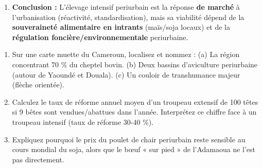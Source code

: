 \documentclass[11pt]{article}
\begin{document}
\begin{exoresolu}
\begin{enumerate}
\begin{itemize}
        \item \textbf{Pression foncière/environnementale :} Urbanisation galopante grignote terres agricoles periurbaines ; gestion effluents (fientes, lisiers) souvent défaillante $\to$ pollution nappes/eaux de surface (ex: Mfoundi, Wouri).
        \item \textbf{Sanitaire :} Concentration animale = risque épizootique majeur (Influenza aviaire, Peste porcine africaine) $\to$ biosécurité coûteuse.
    \end{itemize}
    \item \textbf{Conclusion :} L'élevage intensif periurbain est la réponse \textbf{de marché} à l'urbanisation (réactivité, standardisation), mais sa viabilité dépend de la \textbf{souveraineté alimentaire en intrants} (maïs/soja locaux) et de la \textbf{régulation foncière/environnementale} periurbaine.
\end{enumerate}
\end{exoresolu}

\begin{exercice}
\begin{enumerate}
    \item Sur une carte muette du Cameroun, localisez et nommez : (a) La région concentrant 70 \% du cheptel bovin. (b) Deux bassins d'aviculture periurbaine (autour de Yaoundé et Douala). (c) Un couloir de transhumance majeur (flèche orientée).
    \item Calculez le taux de réforme annuel moyen d'un troupeau extensif de 100 têtes si 9 bêtes sont vendues/abattues dans l'année. Interprétez ce chiffre face à un troupeau intensif (taux de réforme 30-40 \%).
    \item Expliquez pourquoi le prix du poulet de chair periurbain reste sensible au cours mondial du soja, alors que le bœuf « sur pied » de l'Adamaoua ne l'est pas directement.
\end{enumerate}
\end{exercice}
\end{document}
